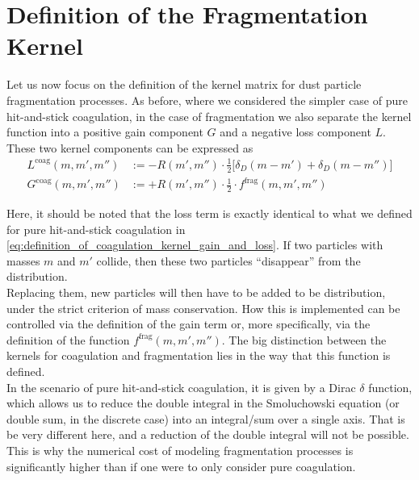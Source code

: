 \clearpage\section{Definition of the Fragmentation Kernel}
\label{sec:fragmentation_kernel}

    Let us now focus on the definition of the kernel matrix for dust particle fragmentation 
    processes. As before, where we considered the simpler case of pure hit-and-stick coagulation,
    in the case of fragmentation we also separate the kernel function into a positive gain 
    component $G$ and a negative loss component $L$. \\

    These two kernel components can be expressed as
    \begin{align}
        L^\text{coag}(m, m', m'') 
            &:= -R(m',m'') \cdot \frac{1}{2} \bigg[\delta_D(m-m')+\delta_D(m-m'')\bigg] \\
        G^\text{coag}(m, m', m'') 
            &:= +R(m',m'') \cdot \frac{1}{2} \cdot f^\text{frag}(m,m',m'')
    \end{align}

    Here, it should be noted that the loss term is exactly identical to what we defined for pure
    hit-and-stick coagulation in \cref{eq:definition_of_coagulation_kernel_gain_and_loss}.
    If two particles with masses $m$ and $m'$ collide, then these two particles ``disappear''
    from the distribution. \\ 

    Replacing them, new particles will then have to be added to be distribution, under the strict 
    criterion of mass conservation. How this is implemented can be controlled via the definition 
    of the gain term or, more specifically, via the definition of the function 
    $f^\text{frag}(m, m', m'')$.
    The big distinction between the kernels for coagulation and fragmentation lies 
    in the way that this function is defined. \\

    In the scenario of pure hit-and-stick coagulation, it is given by a Dirac $\delta$ function,
    which allows us to reduce the double integral in the Smoluchowski equation (or double sum, in 
    the discrete case) into an integral/sum over a single axis. That is be very different here,
    and a reduction of the double integral will not be possible. This is why the numerical 
    cost of modeling fragmentation processes is significantly higher than if one were to only 
    consider pure coagulation. \\

